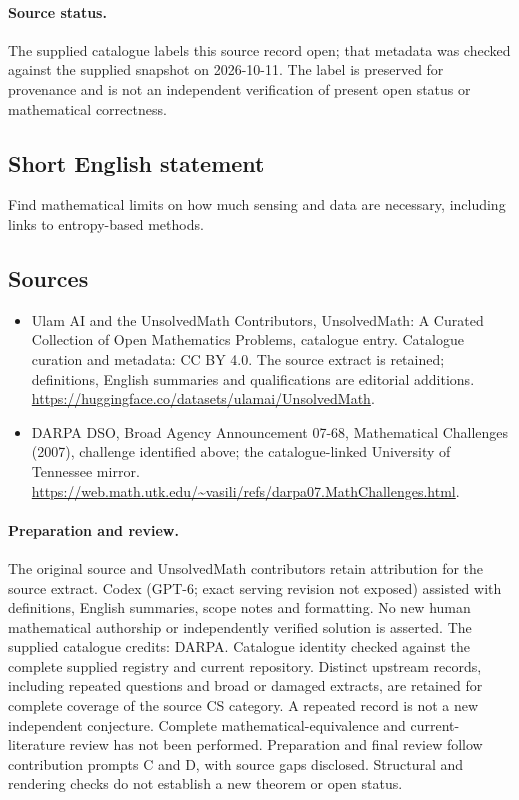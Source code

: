 \documentclass[11pt]{article}
\begin{document}
\paragraph{Source status.}
The supplied catalogue labels this source record open; that metadata was checked against the supplied snapshot on 2026-10-11. The label is preserved for provenance and is not an independent verification of present open status or mathematical correctness.
\subsection{Short English statement}
Find mathematical limits on how much sensing and data are necessary, including links to entropy-based methods.
\subsection{Sources}
\begin{itemize}
\item[\hypertarget{source:statement:1}{S1}] Ulam AI and the UnsolvedMath Contributors, UnsolvedMath: A Curated Collection of Open Mathematics Problems, catalogue entry. Catalogue curation and metadata: CC BY 4.0. The source extract is retained; definitions, English summaries and qualifications are editorial additions.
\url{https://huggingface.co/datasets/ulamai/UnsolvedMath}.
\item[\hypertarget{source:statement:2}{S2}] DARPA DSO, Broad Agency Announcement 07-68, Mathematical Challenges (2007), challenge identified above; the catalogue-linked University of Tennessee mirror.
\url{https://web.math.utk.edu/~vasili/refs/darpa07.MathChallenges.html}.
\end{itemize}
\paragraph{Preparation and review.}
The original source and UnsolvedMath contributors retain attribution for the source extract. Codex (GPT-6; exact serving revision not exposed) assisted with definitions, English summaries, scope notes and formatting. No new human mathematical authorship or independently verified solution is asserted. The supplied catalogue credits: DARPA. Catalogue identity checked against the complete supplied registry and current repository. Distinct upstream records, including repeated questions and broad or damaged extracts, are retained for complete coverage of the source CS category. A repeated record is not a new independent conjecture. Complete mathematical-equivalence and current-literature review has not been performed. Preparation and final review follow contribution prompts C and D, with source gaps disclosed. Structural and rendering checks do not establish a new theorem or open status.
\label{end:statement}
\end{document}
